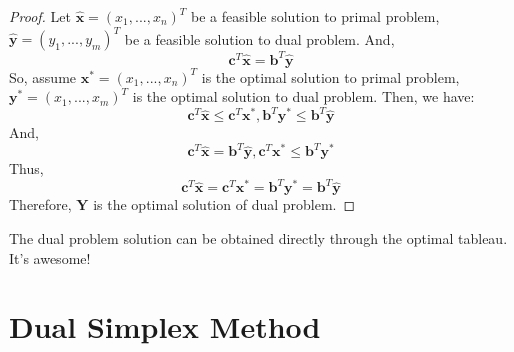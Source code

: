 \documentclass{article}
\begin{document}
\begin{proof}
	Let $\hat{\bm{x}} = (x_1, ..., x_n)^T$ be a feasible solution to primal problem, $\hat{\bm{y}} = (y_1, ..., y_m)^T$ be a feasible solution to dual problem. And,
	\begin{equation}
		\bm{c}^T \hat{\bm{x}}  = \bm{b}^T \hat{\bm{y}}
	\end{equation}
	So, assume $\bm{x}^* = (x_1, ..., x_n)^T$ is the optimal solution to primal problem, $\bm{y}^* = (x_1, ..., x_m)^T$ is the optimal solution to dual problem. Then, we have:
	\begin{equation}
		\bm{c}^T\hat{\bm{x}} \leq \bm{c}^T \bm{x}^*, \bm{b}^T \bm{y}^* \leq \bm{b}^T \hat{\bm{y}}
	\end{equation}
	And, 
	\begin{equation}
		\bm{c}^T\hat{\bm{x}} = \bm{b}^T\hat{\bm{y}}, \bm{c}^T\bm{x}^* \leq \bm{b}^T \bm{y}^*
	\end{equation}
	Thus,
	\begin{equation}
			\bm{c}^T\hat{\bm{x}} = \bm{c}^T \bm{x}^* = \bm{b}^T \bm{y}^* = \bm{b}^T \hat{\bm{y}}
	\end{equation}
	Therefore, $\bm{Y}$ is the optimal solution of dual problem.
\end{proof}

The dual problem solution can be obtained directly through the optimal tableau. It's awesome!


 \section{Dual Simplex Method}



% 
% 
\end{document}
